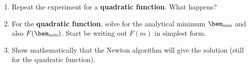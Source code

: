 \documentclass[11pt,titlepage,fleqn]{article}
\renewcommand{\vertgap}{\vspace{1.5cm}}
\begin{document}
\begin{enumerate}
\vertgap

\item Repeat the experiment for a {\bf quadratic function}. What happens?



\item For the {\bf quadratic function}, solve for the analytical minimum $\bem_{\rm min}$ and also $F(\bem_{\rm min})$. Start be writing out $F(m)$ in simplest form.

\vspace{6cm}

\item Show mathematically that the Newton algorithm will give the solution (still for the quadratic function).

\end{enumerate}

%
\end{document}
